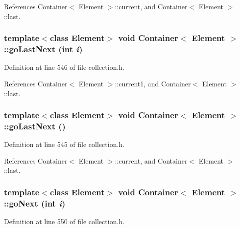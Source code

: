 References Container$<$ Element $>$::current, and Container$<$ Element $>$::last.\hypertarget{classContainer_92a1e8ac5983084378d5a21c18b4326d}{
\subsubsection[{goLastNext}]{\setlength{\rightskip}{0pt plus 5cm}template$<$class Element$>$ void {\bf Container}$<$ Element $>$::goLastNext (int {\em i})}}
\label{classContainer_92a1e8ac5983084378d5a21c18b4326d}




Definition at line 546 of file collection.h.

References Container$<$ Element $>$::current1, and Container$<$ Element $>$::last.\hypertarget{classContainer_472c50cebb8e028054a4ff378596b187}{
\subsubsection[{goLastNext}]{\setlength{\rightskip}{0pt plus 5cm}template$<$class Element$>$ void {\bf Container}$<$ Element $>$::goLastNext ()}}
\label{classContainer_472c50cebb8e028054a4ff378596b187}




Definition at line 545 of file collection.h.

References Container$<$ Element $>$::current, and Container$<$ Element $>$::last.\hypertarget{classContainer_96a071140e5a7fcbfe910c60931c3f09}{
\subsubsection[{goNext}]{\setlength{\rightskip}{0pt plus 5cm}template$<$class Element$>$ void {\bf Container}$<$ Element $>$::goNext (int {\em i})}}
\label{classContainer_96a071140e5a7fcbfe910c60931c3f09}




Definition at line 550 of file collection.h.

